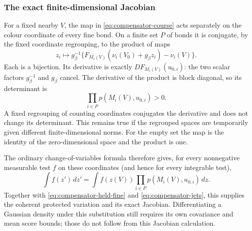 \subsubsection{The exact finite-dimensional Jacobian}
For a fixed nearby $V$, the map in
\eqref{eq:compensator-course} acts separately on the colour coordinate
of every fine bond. On a finite set $P$ of bonds it is conjugate,
by the fixed coordinate regrouping, to the product of maps
\[
 z_i\longmapsto g_\beta^{-1}
       \{F_{M_i(V)}(\nu_i(V_0)+g_\beta z_i)-\nu_i(V)\}.
\]
Each is a bijection. Its derivative is exactly
$D F_{M_i(V)}(u_{0,i})$: the two scalar factors $g_\beta^{-1}$ and
$g_\beta$ cancel. The derivative of the product is block diagonal,
so its determinant is
\begin{equation}\label{eq:compensator-jacobian}
 \prod_{i\in P}p(M_i(V),u_{0,i})>0.
\end{equation}
A fixed regrouping of counting coordinates conjugates the derivative
and does not change its determinant. This remains true if the
regrouped spaces are temporarily given different finite-dimensional
norms. For the empty set the map is the identity of the zero-dimensional
space and the product is one.

The ordinary change-of-variables formula therefore gives, for every
nonnegative measurable test $f$ on these coordinates (and hence for
every integrable test),
\[
 \int f(z')\,dz'
 =\int f(z(V))\prod_{i\in P}p(M_i(V),u_{0,i})\,dz.
\]
Together with \eqref{eq:compensator-held-fine} and
\eqref{eq:compensator-jets}, this supplies the coherent protected
variation and its exact Jacobian. Differentiating a Gaussian density
under this substitution still requires its own covariance and mean
score bounds; those do not follow from this Jacobian calculation.
